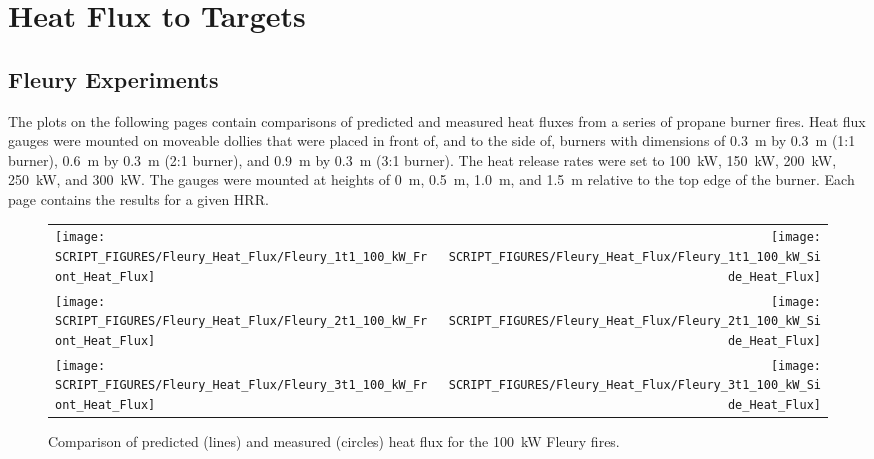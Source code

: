 \clearpage

\section{Heat Flux to Targets}

\subsection{Fleury Experiments}

The plots on the following pages contain comparisons of predicted and measured heat fluxes from a series of propane burner fires. Heat flux gauges were mounted on moveable dollies that were placed in front of, and to the side of, burners with dimensions of 0.3~m by 0.3~m (1:1 burner), 0.6~m by 0.3~m (2:1 burner), and 0.9~m by 0.3~m (3:1 burner). The heat release rates were set to 100~kW, 150~kW, 200~kW, 250~kW, and 300~kW. The gauges were mounted at heights of 0~m, 0.5~m, 1.0~m, and 1.5~m relative to the top edge of the burner. Each page contains the results for a given HRR.

\newpage

\begin{figure}[p]
\begin{tabular*}{\textwidth}{l@{\extracolsep{\fill}}r}
\texttt{[image: SCRIPT\_FIGURES/Fleury\_Heat\_Flux/Fleury\_1t1\_100\_kW\_Front\_Heat\_Flux]} &
\texttt{[image: SCRIPT\_FIGURES/Fleury\_Heat\_Flux/Fleury\_1t1\_100\_kW\_Side\_Heat\_Flux]} \\
\texttt{[image: SCRIPT\_FIGURES/Fleury\_Heat\_Flux/Fleury\_2t1\_100\_kW\_Front\_Heat\_Flux]} &
\texttt{[image: SCRIPT\_FIGURES/Fleury\_Heat\_Flux/Fleury\_2t1\_100\_kW\_Side\_Heat\_Flux]} \\
\texttt{[image: SCRIPT\_FIGURES/Fleury\_Heat\_Flux/Fleury\_3t1\_100\_kW\_Front\_Heat\_Flux]} &
\texttt{[image: SCRIPT\_FIGURES/Fleury\_Heat\_Flux/Fleury\_3t1\_100\_kW\_Side\_Heat\_Flux]}
\end{tabular*}
\label{Fleury_Heat_Flux_100_kW}
\caption[Fleury Heat Flux, 100 kW fires.]
{Comparison of predicted (lines) and measured (circles) heat flux for the 100~kW Fleury fires.}
\end{figure}

